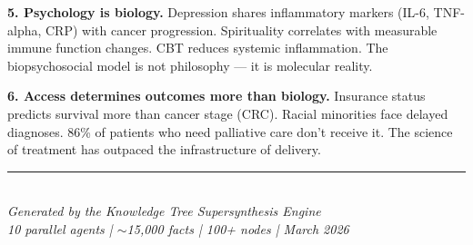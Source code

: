 \textbf{5. Psychology is biology.} Depression shares inflammatory
markers (IL-6, TNF-alpha, CRP) with cancer progression. Spirituality
correlates with measurable immune function changes. CBT reduces systemic
inflammation. The biopsychosocial model is not philosophy --- it is
molecular reality.

\textbf{6. Access determines outcomes more than biology.} Insurance
status predicts survival more than cancer stage (CRC). Racial minorities
face delayed diagnoses. 86\% of patients who need palliative care don't
receive it. The science of treatment has outpaced the infrastructure of
delivery.

\vspace{0.5cm}

\begin{center}
\end{center}

\vspace{1cm}
\begin{center}
\rule{8cm}{0.4pt}\\
\vspace{0.3cm}
\small
\textit{Generated by the Knowledge Tree Supersynthesis Engine}\\
\textit{10 parallel agents | $\sim$15,000 facts | 100+ nodes | March 2026}
\end{center}

